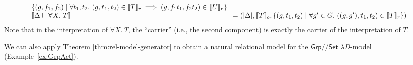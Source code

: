 \documentclass[a4paper,UKenglish]{lipics}
\theoremstyle{plain}
\newcommand{\msf}[1]{\mathsf{#1}} %
\newcommand{\Grp}{\msf{Grp}}
\newcommand{\Set}{\msf{Set}}
\newcommand{\Lslice}[1]{#1/\!/\Set}
\newcommand{\GrpSet}{\Lslice{\Grp}}
\newcommand{\sem}[1]{\ensuremath{\llbracket #1 \rrbracket}}
\newcommand{\semo}[1]{\ensuremath{\llbracket #1 \rrbracket _o}}
\newcommand{\semr}[1]{\ensuremath{\llbracket #1 \rrbracket _r}}
\begin{document}
\begin{example}
\begin{displaymath}
\begin{array}{l@{\hspace{0.3em}}c@{\hspace{0.3em}}l}
\begin{array}[t]{@{}l}
        \{ (g, f_1, f_2) \mathrel| \forall t_1, t_2.~(g,t_1,t_2) \in \semr{T} \implies (g,f_1t_1, f_2t_2) \in \semr{U} \}
      \end{array}
      \\
      \sem{\Delta \vdash \forall X.~T} & = & (|\Delta|,
      \begin{array}[t]{@{}l}
        \semo{T},
        \{ (g, t_1, t_2) \mathrel| \forall g' \in G.~((g,g'), t_1, t_2) \in \semr{T} \} )
      \end{array}
    \end{array}
  \end{displaymath}
Note that in the interpretation of $\forall X.~T$, the ``carrier'' (i.e., the second component) is exactly the carrier of the interpretation of $T$.
\end{example}

We can also apply Theorem \ref{thm:rel-model-generator} to obtain a natural relational model for the $\GrpSet$ $\lambda D$-model (Example~\ref{ex:GrpAct}).
\end{document}
